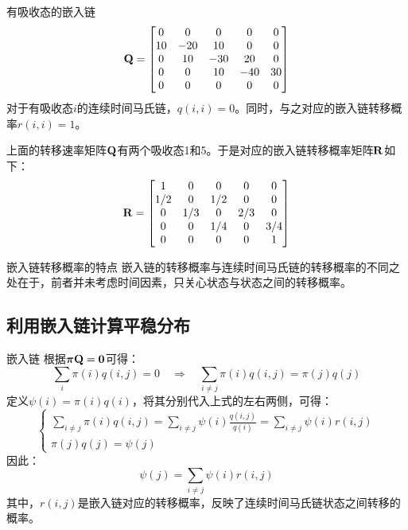 \documentclass[t]{beamer}
\begin{document}
\begin{frame}{有吸收态的嵌入链}\small
  \[{\bf Q}=\begin{bmatrix}
    0&0&0&0&0\\
    10&-20&10&0&0\\
    0&10&-30&20&0\\
    0&0&10&-40&30\\
    0&0&0&0&0\\
      \end{bmatrix}\]
    对于有吸收态$i$的连续时间马氏链，$q(i,i)=0$。同时，与之对应的嵌入链转移概率$r(i,i)=1$。
    
    上面的转移速率矩阵${\bf Q}$有两个吸收态1和5。于是对应的嵌入链转移概率矩阵${\bf R}$如下：
    \[ 	{\bf R}=\begin{bmatrix}
    1&0&0&0&0\\
    1/2&0&1/2&0&0\\
    0&1/3&0&2/3&0\\
    0&0&1/4&0&3/4\\
    0&0&0&0&1\\
      \end{bmatrix}\]
\end{frame}


\begin{frame}{嵌入链转移概率的特点}
  嵌入链的转移概率与连续时间马氏链的转移概率的不同之处在于，前者并未考虑时间因素，只关心状态与状态之间的转移概率。
\end{frame}


\subsection{利用嵌入链计算平稳分布}
\begin{frame}{嵌入链}\small
  根据${\bm{\pi}}{\bf Q}={\bf 0}$可得：
\begin{equation*}
\sum_i \pi(i)q(i,j)=0\quad \Rightarrow\quad \sum_{i\ne j} \pi(i)q(i,j)=\pi(j)q(j)
\end{equation*}
定义$\psi(i)=\pi(i)q(i)$，将其分别代入上式的左右两侧，可得：
\[\begin{cases}
 \sum_{i\ne j} \pi(i)q(i,j)=\sum_{i\ne j} \psi(i)\frac{q(i,j)}{q(i)}=\sum_{i\ne j} \psi(i)r(i,j)\\
\pi(j)q(j)=\psi(j)
\end{cases}\]
因此：
\begin{equation*}
\psi(j)=\sum_{i\ne j} \psi(i)r(i,j)
\end{equation*}
其中，$r(i,j)$是嵌入链对应的转移概率，反映了连续时间马氏链状态之间转移的概率。
\end{frame}
\end{document}
